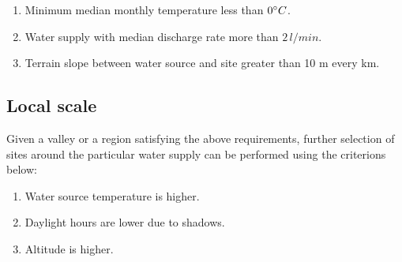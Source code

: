 \begin{enumerate}

  \item Minimum median monthly temperature less than $0 ^{\circ} C$. 
  \item Water supply with median discharge rate more than $2\, l/min$.
  \item Terrain slope between water source and site greater than 10 m every km. 

\end{enumerate}

\subsection{Local scale}

Given a valley or a region satisfying the above requirements, further selection of sites around the particular
water supply can be performed using the criterions below: 

\begin{enumerate}
  \item Water source temperature is higher.
  \item Daylight hours are lower due to shadows.
  \item Altitude is higher.
\end{enumerate}







